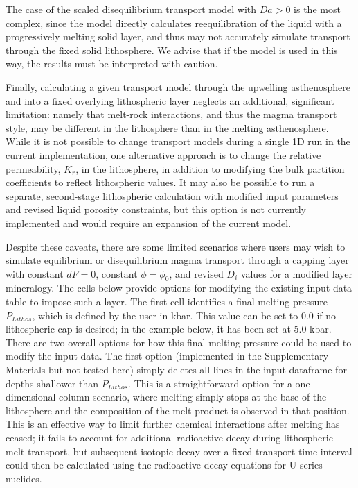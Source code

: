 \documentclass[11pt]{article}
\begin{document}
The case of the scaled disequilibrium transport model with $Da>0$ is the most complex, since the model directly calculates reequilibration of the liquid with a progressively melting solid layer, and thus may not accurately simulate transport through the fixed solid lithosphere. We advise that if the model is used in this way, the results must be interpreted with caution.

Finally, calculating a given transport model through the upwelling asthenosphere and into a fixed overlying lithospheric layer neglects an additional, significant limitation: namely that melt-rock interactions, and thus the magma transport style, may be different in the lithosphere than in the melting asthenosphere. While it is not possible to change transport models during a single 1D run in the current implementation, one alternative approach is to change the relative permeability, $K_r$, in the lithosphere, in addition to modifying the bulk partition coefficients to reflect lithospheric values. It may also be possible to run a separate, second-stage lithospheric calculation with modified input parameters and revised liquid porosity constraints, but this option is not currently implemented and would require an expansion of the current model.

Despite these caveats, there are some limited scenarios where users may wish to simulate equilibrium or disequilibrium magma transport through a capping layer with constant $dF=0$, constant $\phi = \phi_0$, and revised $D_i$ values for a modified layer mineralogy. The cells below provide options for modifying the existing input data table to impose such a layer. The first cell identifies a final melting pressure $P_{Lithos}$, which is defined by the user in kbar. This value can be set to 0.0 if no lithospheric cap is desired; in the example below, it has been set at 5.0 kbar. There are two overall options for how this final melting pressure could be used to modify the input data. The first option (implemented in the Supplementary Materials but not tested here) simply deletes all lines in the input dataframe for depths shallower than $P_{Lithos}$. This is a straightforward option for a one-dimensional column scenario, where melting simply stops at the base of the lithosphere and the composition of the melt product is observed in that position. This is an effective way to limit further chemical interactions after melting has ceased; it fails to account for additional radioactive decay during lithospheric melt transport, but subsequent isotopic decay over a fixed transport time interval could then be calculated using the radioactive decay equations for U-series nuclides.
\end{document}
